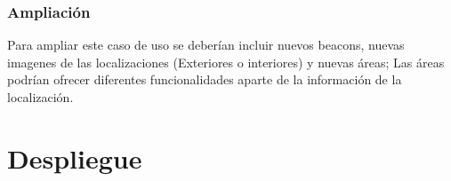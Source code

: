 \subsubsection{Ampliación}

Para ampliar este caso de uso se deberían incluir nuevos beacons, nuevas imagenes de las localizaciones (Exteriores o interiores) y nuevas áreas; Las áreas podrían ofrecer diferentes funcionalidades aparte de la información de la localización.


\section{Despliegue}




